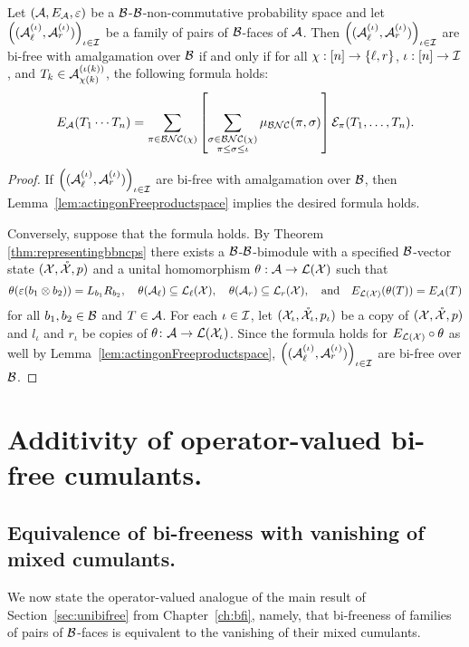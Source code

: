 		\begin{theorem}
			\label{thm:bifreeequivalenttouniversalpolys}
			Let $(\mathcal{A}, E_{\mathcal{A}}, \varepsilon)$ be a $\mathcal{B}$-$\mathcal{B}$-non-commutative probability space and let $\left((\mathcal{A}_\ell^{(\iota)}, \mathcal{A}_r^{(\iota)})\right)_{\iota\in\mathcal{I}}$ be a family of pairs of $\mathcal{B}$-faces of $\mathcal{A}$.
			Then $\left((\mathcal{A}_\ell^{(\iota)}, \mathcal{A}_r^{(\iota)})\right)_{\iota\in\mathcal{I}}$ are bi-free with amalgamation over $\mathcal{B}$ if and only if for all $\chi : [n] \to \left\{\ell, r\right\}$, $\iota : [n] \to \mathcal{I}$, and $T_k \in \mathcal{A}_{\chi(k)}^{(\iota(k))}$, the following formula holds:
			\[
				E_{\mathcal{A}}(T_1 \cdots T_n) = \sum_{\pi \in \mathcal{BNC}(\chi)} \left[ \sum_{\substack{\sigma\in \mathcal{BNC}(\chi)\\\pi\leq\sigma\leq\iota}}\mu_{\mathcal{BNC}}(\pi, \sigma) \right] \mathcal{E}_{\pi}(T_1,\ldots, T_n).
			\]
		\end{theorem}

		\begin{proof}
			If $\left((\mathcal{A}_\ell^{(\iota)}, \mathcal{A}_r^{(\iota)})\right)_{\iota\in\mathcal{I}}$ are bi-free with amalgamation over $\mathcal{B}$, then Lemma~\ref{lem:actingonFreeproductspace} implies the desired formula holds.

			Conversely, suppose that the formula holds.
			By Theorem \ref{thm:representingbbncps} there exists a $\mathcal{B}$-$\mathcal{B}$-bimodule with a specified $\mathcal{B}$-vector state $(\mathcal{X}, \mathring{\mathcal{X}}, p)$ and a unital homomorphism $\theta : \mathcal{A} \to \mathcal{L}(\mathcal{X})$ such that 
			\[
				\theta(\varepsilon(b_1 \otimes b_2)) = L_{b_1} R_{b_2}, \quad \theta(\mathcal{A}_\ell) \subseteq \mathcal{L}_\ell(\mathcal{X}),\quad \theta(\mathcal{A}_r) \subseteq \mathcal{L}_r(\mathcal{X}), \quad \mathrm{and}\quad E_{\mathcal{L}(\mathcal{X})}(\theta(T)) = E_{\mathcal{A}}(T)
			\]
			for all $b_1, b_2 \in \mathcal{B}$ and $T \in \mathcal{A}$.
			For each $\iota \in \mathcal{I}$, let $(\mathcal{X}_\iota, \mathring{\mathcal{X}}_\iota, p_\iota)$ be a copy of $(\mathcal{X}, \mathring{\mathcal{X}}, p)$ and $l_\iota$ and $r_\iota$ be copies of $\theta\colon \mathcal{A}\to \mathcal{L}(\mathcal{X}_\iota)$.
			Since the formula holds for $E_{\mathcal{L}(\mathcal{X})}\circ\theta$ as well by Lemma~\ref{lem:actingonFreeproductspace}, $\left((\mathcal{A}_\ell^{(\iota)}, \mathcal{A}_r^{(\iota)})\right)_{\iota\in\mathcal{I}}$ are bi-free over $\mathcal{B}$.
		\end{proof}


		\section{Additivity of operator-valued bi-free cumulants.}
		\label{sec:additivity}

		\subsection{Equivalence of bi-freeness with vanishing of mixed cumulants.}
		We now state the operator-valued analogue of the main result of Section~\ref{sec:unibifree} from Chapter~\ref{ch:bfi}, namely, that bi-freeness of families of pairs of $\mathcal{B}$-faces is equivalent to the vanishing of their mixed cumulants.

